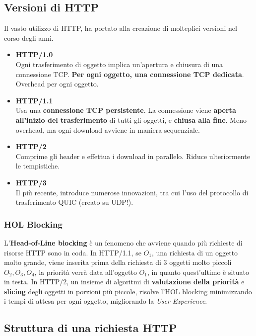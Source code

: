 \subsection{Versioni di HTTP}
Il vasto utilizzo di HTTP, ha portato alla creazione di molteplici versioni nel corso degli anni.
\begin{itemize}
    \item \textbf{HTTP/1.0}\\
    Ogni trasferimento di oggetto implica un'apertura e chiusura di una connessione TCP. \textbf{Per ogni oggetto, una connessione TCP dedicata}. Overhead per ogni oggetto.
    \item \textbf{HTTP/1.1}\\
    Usa una \textbf{connessione TCP persistente}. La connessione viene \textbf{aperta all'inizio del trasferimento} di tutti gli oggetti, e \textbf{chiusa alla fine}. Meno overhead, ma ogni download avviene in maniera sequenziale.
    \item \textbf{HTTP/2}\\
    Comprime gli header e effettua i download in parallelo. Riduce ulteriormente le tempistiche.
    \item \textbf{HTTP/3}\\
    Il più recente, introduce numerose innovazioni, tra cui l'uso del protocollo di trasferimento QUIC (creato su UDP!).
\end{itemize}

\subsubsection{HOL Blocking}
L'\textbf{Head-of-Line blocking} è un fenomeno che avviene quando più richieste di risorse HTTP sono in coda. In HTTP/1.1, se $O_1$, una richiesta di un oggetto molto grande, viene inserita prima della richiesta di 3 oggetti molto piccoli $O_2,O_3,O_4$, la priorità verrà data all'oggetto $O_1$, in quanto quest'ultimo è situato in testa.
In HTTP/2, un insieme di algoritmi di \textbf{valutazione della priorità} e \textbf{slicing} degli oggetti in porzioni più piccole, risolve l'HOL blocking minimizzando i tempi di attesa per ogni oggetto, migliorando la \textit{User Experience}.

\newpage

\subsection{Struttura di una richiesta HTTP}

